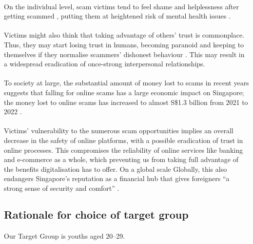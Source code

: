 \documentclass[a4paper]{article}
\begin{document}
\paragraph{} On the individual level, scam victims tend to feel shame and
helplessness after getting scammed \parencite{CNA.2022}, putting them at
heightened risk of mental health issues \parencite{SiowDivi.2023}.

\paragraph{} Victims might also think that taking advantage of others’ trust is
commonplace. Thus, they may start losing trust in humans, becoming paranoid and
keeping to themselves if they normalise scammers’ dishonest behaviour
\parencite{SiowDivi.2023}. This may result in a widespread eradication of
once-strong interpersonal relationships.

\paragraph{} To society at large, the substantial amount of money lost to scams
in recent years suggests that falling for online scams has a large economic
impact on Singapore; the money lost to online scams has increased to almost
S\$1.3 billion from 2021 to 2022 \parencite{Chua.2023}.

\paragraph{}
Victims' vulnerability to the numerous scam opportunities implies an overall
decrease in the safety of online platforms, with a possible eradication of trust
in online processes. This compromises the reliability of online services like
banking and e-commerce as a whole, which preventing us from taking full
advantage of the benefits digitalisation has to offer. On a global scale
Globally, this also endangers Singapore’s reputation as a financial hub that
gives foreigners ``a strong sense of security and comfort'' \parencite{Rikvin}.

\subsection{Rationale for choice of target group}
\paragraph{} Our Target Group is youths aged 20--29.
\end{document}
